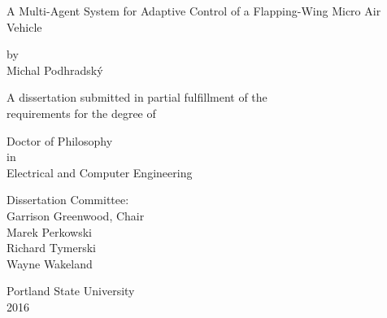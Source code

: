 \thispagestyle{empty}

\noindent


\begin{center}
   A Multi-Agent System for Adaptive Control of a Flapping-Wing Micro Air Vehicle
\end{center}

\vspace{50pt}

\begin{center}
    by\\
    \vspace{20pt}
    Michal Podhradsk\'y
\end{center}

\vspace{30pt}

\begin{center}
A dissertation submitted in partial fulfillment of the\\
requirements for the degree of\\
\end{center}

\vspace{10pt}

\begin{center}
Doctor of Philosophy\\
in\\
Electrical and Computer Engineering
\end{center}

\vspace{30pt}

\begin{center}
Dissertation Committee:\\
Garrison Greenwood, Chair\\
Marek Perkowski \\
Richard Tymerski\\
Wayne Wakeland
\end{center}

\vfill\vfill\vfill\vfill

\begin{center}
    Portland State University\\
    2016
\end{center}
\clearpage


\restoregeometry